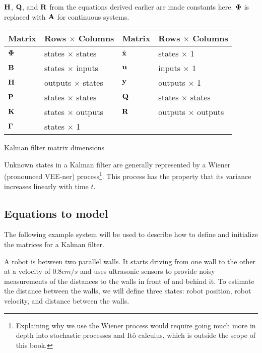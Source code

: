 $\mathbf{H}$, $\mathbf{Q}$, and $\mathbf{R}$ from the equations derived earlier are made
constants here. $\mathbf{\Phi}$ is replaced with $\mathbf{A}$ for continuous systems.

\begin{booktable}
  \begin{tabular}{|ll|ll|}
    \hline
    \rowcolor{headingbg}
    \textbf{Matrix} & \textbf{Rows $\times$ Columns} &
    \textbf{Matrix} & \textbf{Rows $\times$ Columns} \\
    \hline
    $\mathbf{\Phi}$ & states $\times$ states & $\hat{\mathbf{x}}$ & states $\times$ 1
      \\
    $\mathbf{B}$ & states $\times$ inputs & $\mathbf{u}$ & inputs $\times$ 1 \\
    $\mathbf{H}$ & outputs $\times$ states & $\mathbf{y}$ & outputs $\times$ 1 \\
    $\mathbf{P}$ & states $\times$ states & $\mathbf{Q}$ & states $\times$ states \\
    $\mathbf{K}$ & states $\times$ outputs & $\mathbf{R}$ & outputs $\times$ outputs
      \\
    $\mathbf{\Gamma}$ & states $\times$ 1 &  &  \\
    \hline
  \end{tabular}
  \caption{Kalman filter matrix dimensions}
  \label{tab:kf_matrix_dims}
\end{booktable}

Unknown states in a Kalman filter are generally represented by a Wiener
(pronounced VEE-ner) process\footnote{Explaining why we use the Wiener process
would require going much more in depth into stochastic processes and It\^{o}
calculus, which is outside the scope of this book.}. This process has the
property that its variance increases linearly with time $t$.

\subsection{Equations to model}

The following example system will be used to describe how to define and
initialize the matrices for a Kalman filter.

A robot is between two parallel walls. It starts driving from one wall to the
other at a velocity of $0.8 cm/s$ and uses ultrasonic sensors to provide noisy
measurements of the distances to the walls in front of and behind it. To
estimate the distance between the walls, we will define three states: robot
position, robot velocity, and distance between the walls.

